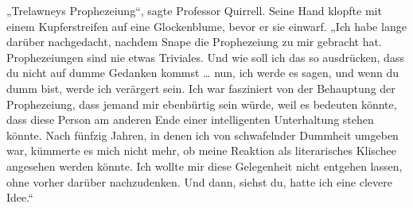 „Trelawneys Prophezeiung“, sagte Professor Quirrell.
Seine Hand klopfte mit einem Kupferstreifen auf eine Glockenblume, bevor er sie einwarf.
„Ich habe lange darüber nachgedacht, nachdem Snape die Prophezeiung zu mir gebracht hat. Prophezeiungen sind nie etwas Triviales. Und wie soll ich das so ausdrücken, dass du nicht auf dumme Gedanken kommst … nun, ich werde es sagen, und wenn du dumm bist, werde ich verärgert sein. Ich war fasziniert von der Behauptung der Prophezeiung, dass jemand mir ebenbürtig sein würde, weil es bedeuten könnte, dass diese Person am anderen Ende einer intelligenten Unterhaltung stehen könnte. Nach fünfzig Jahren, in denen ich von schwafelnder Dummheit umgeben war, kümmerte es mich nicht mehr, ob meine Reaktion als literarisches Klischee angesehen werden könnte. Ich wollte mir diese Gelegenheit nicht entgehen lassen, ohne vorher darüber nachzudenken. Und dann, siehst du, hatte ich eine clevere Idee.“
